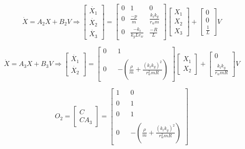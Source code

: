 \documentclass[11pt,titlepage]{report}
\begin{document}
\begin{equation} \label{eq:state_space2}
	\dot{X} = A_{2}X + B_{2}V   \Longrightarrow
    \begin{bmatrix}
    \dot{X_{1}} \\ 
    \dot{X_{2}} \\
    \dot{X_{3}}
    \end{bmatrix} = \begin{bmatrix}
        0 & 1 & 0 \\ 
        0 & \frac{-p}{m} & \frac{k_{t}k_{g}}{r_{w}m} \\ 
        0 & \frac{-k_{t}}{k_{g}Lr_{w}} & \frac{-R}{L}
     \end{bmatrix}
    \begin{bmatrix}
        X_{1} \\
        X_{2} \\
        X_{3}
    \end{bmatrix} + \begin{bmatrix}
    0 \\  0 \\ 
    \frac{1}{L}
    \end{bmatrix}V
\end{equation}



\begin{equation} \label{eq:state_space3}
	\dot{X} = A_{3}X + B_{3}V   \Longrightarrow
    \begin{bmatrix}
    \dot{X_{1}} \\ 
    \dot{X_{2}} 
    \end{bmatrix} = \begin{bmatrix}
        0 & & 1 \\ \\
        0 & & -(\frac{{\rho}}{m}+\frac{(k_{t}k_{g})^2}{r_{w}^2mR})  
     \end{bmatrix}
    \begin{bmatrix}
        X_{1} \\
        X_{2} 
    \end{bmatrix} + \begin{bmatrix}
    0 \\ \\
    \frac{k_{t}k_{g}}{r_{w}mR}
    \end{bmatrix}V
\end{equation}



\begin{equation} \label{eq:observable2}
	O_{2} = \begin{bmatrix}
	  C \\
	  CA_{3}
	\end{bmatrix} = \begin{bmatrix}
	1 & & 0 \\ \\
	0 & & 1 \\ \\
	0 & & 1 \\ \\
	0 & & -(\frac{{\rho}}{m}+\frac{(k_{t}k_{g})^2}{r_{w}^2mR})  
	\end{bmatrix}
\end{equation}
\end{document}
